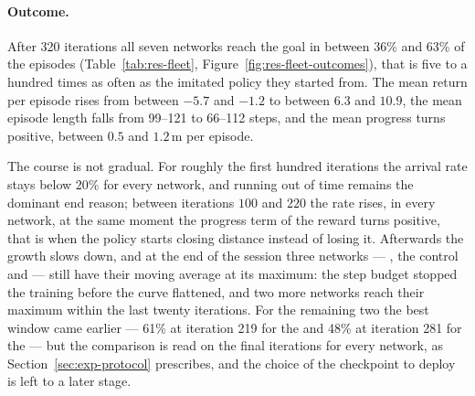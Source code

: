 \paragraph{Outcome.}
After \num{320} iterations all seven networks reach the goal in between 36\%
and 63\% of the episodes (Table~\ref{tab:res-fleet},
Figure~\ref{fig:res-fleet-outcomes}), that is five to a hundred times as often
as the imitated policy they started from. The mean return per episode rises
from between $-5.7$ and $-1.2$ to between $6.3$ and $10.9$, the mean episode
length falls from \num{99}--\num{121} to \num{66}--\num{112} steps, and the
mean progress turns positive, between $0.5$ and $1.2$\,m per episode.

The course is not gradual. For roughly the first hundred iterations the arrival
rate stays below 20\% for every network, and running out of time remains the
dominant end reason; between iterations $100$ and $220$ the rate rises, in
every network, at the same moment the progress term of the reward turns
positive, that is when the policy starts closing distance instead of losing it.
Afterwards the growth slows down, and at the end of the session three networks
--- , the control and  --- still
have their moving average at its maximum: the step budget stopped the training
before the curve flattened, and two more networks reach their maximum within
the last twenty iterations. For the remaining two the best window came earlier
--- 61\% at iteration \num{219} for the  and 48\% at
iteration \num{281} for the  --- but the comparison is read
on the final iterations for every network, as Section~\ref{sec:exp-protocol}
prescribes, and the choice of the checkpoint to deploy is left to a later
stage.


